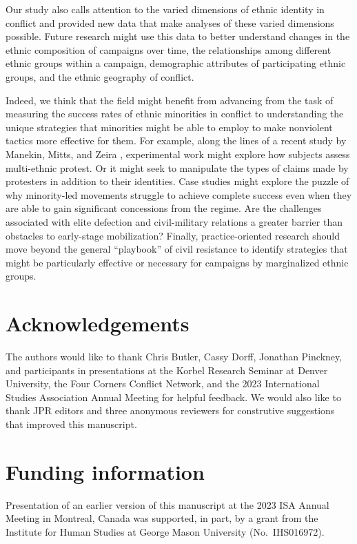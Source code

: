 \documentclass[
  letterpaper,
  DIV=11,
  numbers=noendperiod]{scrartcl}
\begin{document}
Our study also calls attention to the varied dimensions of ethnic
identity in conflict and provided new data that make analyses of these
varied dimensions possible. Future research might use this data to
better understand changes in the ethnic composition of campaigns over
time, the relationships among different ethnic groups within a campaign,
demographic attributes of participating ethnic groups, and the ethnic
geography of conflict.

Indeed, we think that the field might benefit from advancing from the
task of measuring the success rates of ethnic minorities in conflict to
understanding the unique strategies that minorities might be able to
employ to make nonviolent tactics more effective for them. For example,
along the lines of a recent study by Manekin, Mitts, and Zeira
\autocite*{Manekin2024}, experimental work might explore how subjects
assess multi-ethnic protest. Or it might seek to manipulate the types of
claims made by protesters in addition to their identities. Case studies
might explore the puzzle of why minority-led movements struggle to
achieve complete success even when they are able to gain significant
concessions from the regime. Are the challenges associated with elite
defection and civil-military relations a greater barrier than obstacles
to early-stage mobilization? Finally, practice-oriented research should
move beyond the general ``playbook'' of civil resistance to identify
strategies that might be particularly effective or necessary for
campaigns by marginalized ethnic groups.

\section{Acknowledgements}\label{acknowledgements}

The authors would like to thank Chris Butler, Cassy Dorff, Jonathan
Pinckney, and participants in presentations at the Korbel Research
Seminar at Denver University, the Four Corners Conflict Network, and the
2023 International Studies Association Annual Meeting for helpful
feedback. We would also like to thank JPR editors and three anonymous
reviewers for construtive suggestions that improved this manuscript.

\section{Funding information}\label{funding-information}

Presentation of an earlier version of this manuscript at the 2023 ISA
Annual Meeting in Montreal, Canada was supported, in part, by a grant
from the Institute for Human Studies at George Mason University
(No.~IHS016972).
\end{document}
